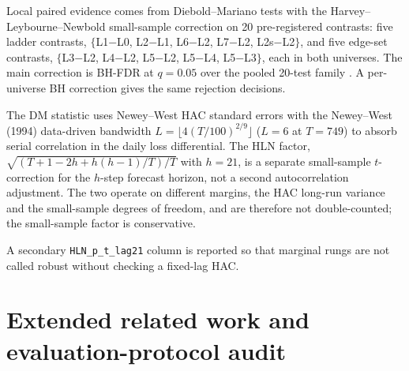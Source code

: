 \documentclass{article}
\begin{document}
Local paired evidence comes from Diebold--Mariano tests \citep{diebold1995comparing} with the Harvey--Leybourne--Newbold small-sample correction \citep{harvey1997testing} on 20 pre-registered contrasts: five ladder contrasts, $\{$L1$-$L0, L2$-$L1, L6$-$L2, L7$-$L2, L2s$-$L2$\}$, and five edge-set contrasts, $\{$L3$-$L2, L4$-$L2, L5$-$L2, L5$-$L4, L5$-$L3$\}$, each in both universes. The main correction is BH-FDR at $q=0.05$ over the pooled 20-test family \citep{benjamini1995controlling}. A per-universe BH correction gives the same rejection decisions.

The DM statistic uses Newey--West HAC standard errors \citep{newey1987simple} with the Newey--West (1994) data-driven bandwidth $L=\lfloor 4(T/100)^{2/9}\rfloor$ ($L=6$ at $T=749$) to absorb serial correlation in the daily loss differential. The HLN factor, $\sqrt{(T+1-2h+h(h-1)/T)/T}$ with $h=21$, is a separate small-sample $t$-correction for the $h$-step forecast horizon, not a second autocorrelation adjustment. The two operate on different margins, the HAC long-run variance and the small-sample degrees of freedom, and are therefore not double-counted; the small-sample factor is conservative.

A secondary \texttt{HLN\_p\_t\_lag21} column is reported so that marginal rungs are not called robust without checking a fixed-lag HAC.


\section{Extended related work and evaluation-protocol audit}\label{app:lit}
\end{document}
